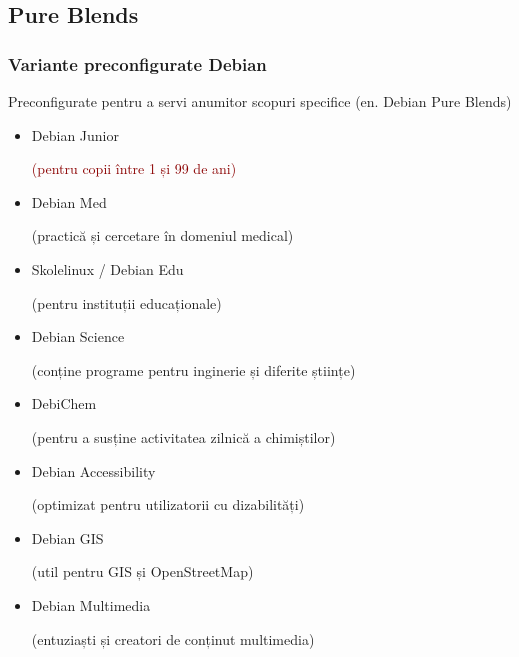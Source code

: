 \documentclass[xcolor=dvipsnames]{beamer}
\begin{document}
\subsection{Pure Blends}
\begin{frame}
\frametitle{Variante preconfigurate Debian}
\begin{block}
{Preconfigurate pentru a servi anumitor scopuri specifice}
(en. Debian Pure Blends)\\
\begin{itemize}
\item Debian Junior
	\begin{footnotesize}
		\textcolor{darkred}{(pentru copii între 1 și 99 de ani)}
	\end{footnotesize} 
\item \textcolor{fade}{Debian Med}
	\begin{footnotesize}
		\textcolor{fade}{(practică și cercetare în domeniul medical)}
	\end{footnotesize} 
\item \textcolor{fade}{Skolelinux / Debian Edu}
	\begin{footnotesize}
		\textcolor{fade}{(pentru instituții educaționale)}
	\end{footnotesize} 
\item \textcolor{fade}{Debian Science}
	\begin{footnotesize}
		\textcolor{fade}{(conține programe pentru inginerie și diferite științe)}
	\end{footnotesize} 
\item \textcolor{fade}{DebiChem}
	\begin{footnotesize}
		\textcolor{fade}{(pentru a susține activitatea zilnică a chimiștilor)}
	\end{footnotesize} 
\item \textcolor{fade}{Debian Accessibility}
	\begin{footnotesize}
		\textcolor{fade}{(optimizat pentru utilizatorii cu dizabilități)}
	\end{footnotesize} 
\item \textcolor{fade}{Debian GIS}
	\begin{footnotesize}
		\textcolor{fade}{(util pentru GIS și OpenStreetMap)}
	\end{footnotesize} 
\item \textcolor{fade}{Debian Multimedia}
	\begin{footnotesize}
		\textcolor{fade}{(entuziaști și creatori de conținut multimedia)}
	\end{footnotesize} 
\end{itemize}
\end{block}
\end{frame}
\end{document}
